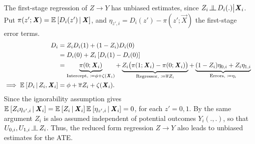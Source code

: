 The first-stage regression of $Z \to Y$ has unbiased estimates, since $Z_i \indep D_i(.) \big| \vec X_i$.
Put $\pi(z'; \boldsymbol{\mathit{X}}) = \mathbb{E}_{} \left[ D_i(z') \, \middle\vert \, \boldsymbol{\mathit{X}} \right]$, and $\eta_{z', i} = D_i(z') - \pi(z'; \vec X)$ the first-stage error terms.
\begin{align*}
    D_i &= Z_i D_i(1) + (1 - Z_i) D_i(0) \\
        &= D_i(0) +
            Z_i \left[ D_i(1) - D_i(0) \right] \\
        &= \underbrace{\pi(0; \boldsymbol{\mathit{X}}_i) 
        }_{\text{Intercept, } \coloneqq \phi + \zeta(\boldsymbol{\mathit{X}}_i)} +
            \underbrace{Z_i \big( \pi(1; \boldsymbol{\mathit{X}}_i) - \pi(0; \boldsymbol{\mathit{X}}_i) \big)}_{
                \text{Regressor, } \coloneqq \overline{\pi} Z_i }
        + \underbrace{(1- Z_i) \eta_{0,i} + Z_i \eta_{1,i}}_{
            \text{Errors, } \coloneqq \eta_i} \\
    \implies \mathbb{E}_{} \left[ D_i \, \middle\vert \, Z_i, \boldsymbol{\mathit{X}}_i \right]
        &= \phi + \overline{\pi} Z_i + \zeta(\boldsymbol{\mathit{X}}_i).
\end{align*}
Since the ignorability assumption gives $\mathbb{E}_{} \left[ Z_i \eta_{z',i} \, \middle\vert \, \boldsymbol{\mathit{X}}_i \right] = \mathbb{E}_{} \left[ Z_i \, \middle\vert \, \boldsymbol{\mathit{X}}_i \right] \mathbb{E}_{} \left[ \eta_{z',i} \, \middle\vert \, \boldsymbol{\mathit{X}}_i \right] = 0$, for each $z' =0,1$.
By the same argument $Z_i$ is also assumed independent of potential outcomes $Y_i(.,.)$, so that $U_{0,i}, U_{1,i} \indep Z_i$.
Thus, the reduced form regression $Z \to Y$ also leads to unbiased estimates for the ATE.

